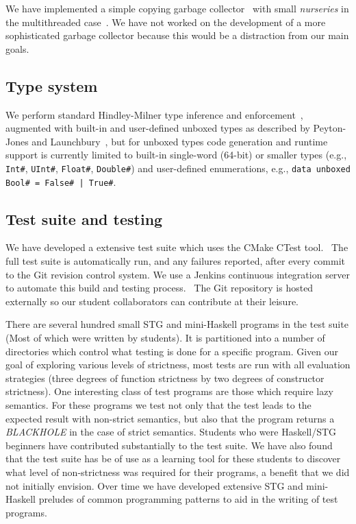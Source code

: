 \documentclass{llncs}
\begin{document}
We have implemented a simple copying garbage collector~\cite{Cheney:1970} with
small \emph{nurseries} in the multithreaded case~\cite{Marlow:2008}. We have
not worked on the development of a more sophisticated garbage collector
because this would be a distraction from our main goals.


\subsection{Type system}

We perform standard Hindley-Milner type inference and
enforcement~\cite{Heren02}, augmented with built-in and user-defined unboxed
types as described by Peyton-Jones and Launchbury~\cite{Jones:1991},
but for unboxed types code generation and runtime support is currently limited
to built-in single-word (64-bit) or smaller types (e.g., \texttt{Int\#},
\texttt{UInt\#}, \texttt{Float\#}, \texttt{Double\#}) and user-defined
enumerations, e.g., \texttt{data unboxed Bool\# = False\# | True\#}.

\subsection{Test suite and testing}

We have developed a extensive test suite which uses the CMake CTest
tool.~\cite{cmake-book} The full test suite is automatically run, and any
failures reported, after every commit to the Git revision control system. We
use a Jenkins continuous integration server to automate this build and testing
process.~\cite{jenkins-book} The Git repository is hosted externally so our
student collaborators can contribute at their leisure.

There are several hundred small STG and mini-Haskell programs in the test suite 
(Most of which were written by students).
It is partitioned into a number of directories which control what
testing is done for a specific program. Given our goal of exploring various
levels of strictness, most tests are run with all evaluation strategies (three
degrees of function strictness by two degrees of constructor strictness).
One interesting class of test programs are those which require lazy
semantics. For these programs we test not only that the test leads to the expected
result with non-strict semantics, but also that the program returns a
\emph{BLACKHOLE} in the case of strict semantics. Students who were Haskell/STG
beginners have contributed substantially to the test suite. We have also found
that the test suite has be of use as a learning tool for these students to
discover what level of non-strictness was required for their programs,
a benefit that we did not initially envision. Over time we have developed
extensive STG and mini-Haskell preludes of common programming patterns to
aid in the writing of test programs.
\end{document}

